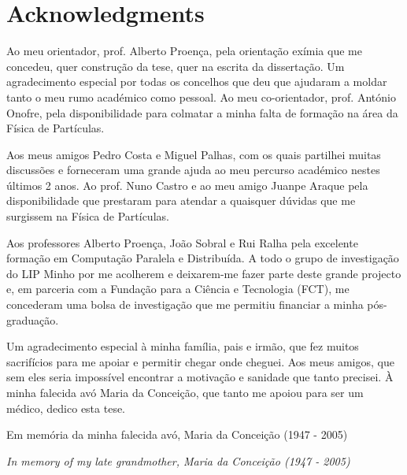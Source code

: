 \chapter*{Acknowledgments}

Ao meu orientador, prof. Alberto Proença, pela orientação exímia que me concedeu, quer construção da tese, quer na escrita da dissertação. Um agradecimento especial por todas os concelhos que deu que ajudaram a moldar tanto o meu rumo académico como pessoal. Ao meu co-orientador, prof. António Onofre, pela disponibilidade para colmatar a minha falta de formação na área da Física de Partículas.

Aos meus amigos Pedro Costa e Miguel Palhas, com os quais partilhei muitas discussões e forneceram uma grande ajuda ao meu percurso académico nestes últimos 2 anos. Ao prof. Nuno Castro e ao meu amigo Juanpe Araque pela disponibilidade que prestaram para atendar a quaisquer dúvidas que me surgissem na Física de Partículas.

Aos professores Alberto Proença, João Sobral e Rui Ralha pela excelente formação em Computação Paralela e Distribuída. A todo o grupo de investigação do LIP Minho por me acolherem e deixarem-me fazer parte deste grande projecto e, em parceria com a Fundação para a Ciência e Tecnologia (FCT), me concederam uma bolsa de investigação que me permitiu financiar a minha pós-graduação.

Um agradecimento especial à minha família, pais e irmão, que fez muitos sacrifícios para me apoiar e permitir chegar onde cheguei. Aos meus amigos, que sem eles seria impossível encontrar a motivação e sanidade que tanto precisei. À minha falecida avó Maria da Conceição, que tanto me apoiou para ser um médico, dedico esta tese.

\newpage

\vspace*{\fill}
\begin{center}
Em memória da minha falecida avó, Maria da Conceição (1947 - 2005)

\textit{In memory of my late grandmother, Maria da Conceição (1947 - 2005)}
\end{center}
\vspace*{\fill}